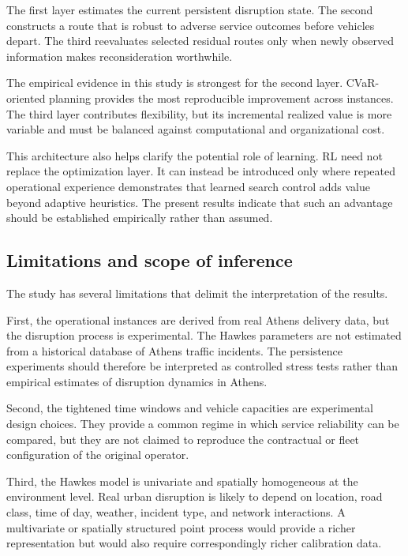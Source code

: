\documentclass[preprint,12pt]{elsarticle}
\newcommand{\1}{\mathbf{1}}
\begin{document}
The first layer estimates the current persistent disruption state.
The second constructs a route that is robust to adverse service outcomes before
vehicles depart.
The third reevaluates selected residual routes only when newly observed
information makes reconsideration worthwhile.

The empirical evidence in this study is strongest for the second layer.
CVaR-oriented planning provides the most reproducible improvement across
instances. The third layer contributes flexibility, but its incremental realized
value is more variable and must be balanced against computational and
organizational cost.

This architecture also helps clarify the potential role of learning.
RL need not replace the optimization layer. It can instead be introduced only
where repeated operational experience demonstrates that learned search control
adds value beyond adaptive heuristics. The present results indicate that such an
advantage should be established empirically rather than assumed.

\subsection{Limitations and scope of inference}
\label{subsec:limitations}

The study has several limitations that delimit the interpretation of the
results.

First, the operational instances are derived from real Athens delivery data,
but the disruption process is experimental. The Hawkes parameters are not
estimated from a historical database of Athens traffic incidents. The
persistence experiments should therefore be interpreted as controlled stress
tests rather than empirical estimates of disruption dynamics in Athens.

Second, the tightened time windows and vehicle capacities are experimental
design choices. They provide a common regime in which service reliability can
be compared, but they are not claimed to reproduce the contractual or fleet
configuration of the original operator.

Third, the Hawkes model is univariate and spatially homogeneous at the
environment level. Real urban disruption is likely to depend on location, road
class, time of day, weather, incident type, and network interactions. A
multivariate or spatially structured point process would provide a richer
representation but would also require correspondingly richer calibration data.
\end{document}
